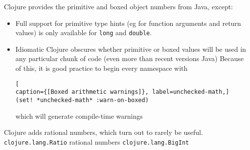 Clojure provides the primitive and boxed object numbers from Java,
except:
\begin{itemize}
  \item Full support for primitive type hints (eg for function arguments and
  return values) is only available for \lstinline|long| and \lstinline|double|.
  \item Idiomatic Clojure obscures whether primitive or boxed values will be
  used in any particular chunk of code (even more than recent versions  Java)
  Because of this, it is good practice to begin every namespace with
\begin{lstlisting}[
caption={[Boxed arithmetic warnings]}, label=unchecked-math,]  
(set! *unchecked-math* :warn-on-boxed)
\end{lstlisting}
which will generate compile-time warnings
\end{itemize}

Clojure adds rational numbers, which turn out to rarely be useful.\\
\lstinline|clojure.lang.Ratio| rational numbers
\lstinline|clojure.lang.BigInt|~\cite[p.~428]{Emerick2012ClojureProgramming}

